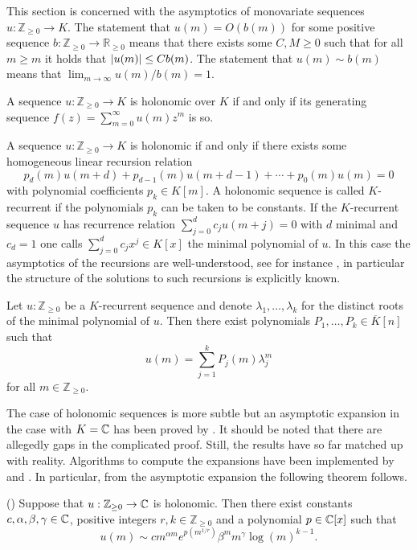    This section is concerned with the asymptotics of monovariate sequences $u:\mathbb{Z}_{\geq 0}\to K$.
    The statement that $u(m) = O(b(m))$ for some positive sequence $b:\mathbb{Z}_{\geq 0}\to \mathbb{R}_{\geq 0}$ means that there exists some $C,M\geq 0$ such that for all $m\geq m$ it holds that $\vert u(m) \vert\leq Cb(m)$.
    The statement that $u(m)\sim b(m)$ means that $\lim_{m\to \infty} u(m)/b(m) = 1$.
    \begin{theorem}{\cite[Theorem 1.5]{stanley1980differentiably}}\label{thm: GeneratingFunction}
      A sequence $u:\mathbb{Z}_{\geq 0}\to K$ is holonomic over $K$ if and only if its generating sequence $f(z) = \sum_{m=0}^{\infty} u(m)z^m$ is so.
    \end{theorem}
    A sequence $u:\mathbb{Z}_{\geq 0}\to K$ is holonomic if and only if there exists some homogeneous linear recursion relation
    $$p_d(m)u(m+d) + p_{d-1}(m)u(m+d-1) + \cdots + p_0(m)u(m) = 0 $$
    with polynomial coefficients $p_k \in K[m]$.
    A holonomic sequence is called $K$-recurrent if the polynomials $p_k$ can be taken to be constants.
    If the $K$-recurrent sequence $u$ has recurrence relation $\sum_{j=0}^d c_{j}u(m+j)= 0$ with $d$ minimal and $c_d = 1$ one calls $\sum_{j=0}^d c_jx^j\in K[x]$ the minimal polynomial of $u$.
    In this case the asymptotics of the recursions are well-understood, see for instance \cite[Chapter 2]{everest2003recurrence}, in particular the structure of the solutions to such recursions is explicitly known.
    \begin{theorem}{\cite[Theorem 1.6]{nobleAsymptotics}}
      Let $u:\mathbb{Z}_{\geq 0}$ be a $K$-recurrent sequence and denote $\lambda_1,\ldots,\lambda_k$ for the distinct roots of the minimal polynomial of $u$.
      Then there exist polynomials $P_1,\ldots,P_k \in \overline{K}[n]$ such that
      $$u(m) = \sum_{j=1}^k P_j(m)\lambda_j^m$$
      for all $m\in \mathbb{Z}_{\geq 0}$.
    \end{theorem}
    The case of holonomic sequences is more subtle but an asymptotic expansion in the case with $K = \mathbb{C}$ has been proved by \cite{birkhoff1933analytic}.
    It should be noted that there are allegedly gaps in the complicated proof.
    Still, the results have so far matched up with reality.
    Algorithms to compute the expansions have been implemented by \cite{kauers2011mathematica} and \cite{zeilberger1990holonomic}.
    In particular, from the asymptotic expansion the following theorem follows.
    \begin{theorem}(\cite{birkhoff1933analytic})
      Suppose that $u:\mathbb{Z}_{\geq 0}\to \mathbb{C}$ is holonomic. Then there exist constants $c,\alpha, \beta, \gamma \in \mathbb{C}$, positive integers $r,k\in \mathbb{Z}_{\geq 0}$ and a polynomial $p\in \mathbb{C}[x]$ such that
      $$u(m) \sim cm^{\alpha m} e^{p(m^{1/r})}\beta^m m^\gamma \log(m)^{k-1}.$$
    \end{theorem}
